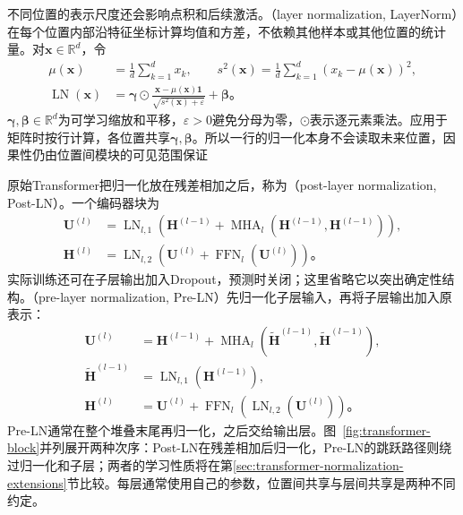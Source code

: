 不同位置的表示尺度还会影响点积和后续激活。（layer normalization, LayerNorm）在每个位置内部沿特征坐标计算均值和方差，不依赖其他样本或其他位置的统计量。对$\bm x\in\mathbb R^d$，令
\begin{equation}
  \begin{aligned}
    \mu(\bm x)&=\frac1d\sum_{k=1}^d x_k,\qquad
    s^2(\bm x)=\frac1d\sum_{k=1}^d(x_k-\mu(\bm x))^2,\\
    \operatorname{LN}(\bm x)
      &=\bm\gamma\odot
        \frac{\bm x-\mu(\bm x)\bm 1}{\sqrt{s^2(\bm x)+\varepsilon}}
        +\bm\beta\text{。}
  \end{aligned}
  \label{eq:transformer-layernorm}
\end{equation}
$\bm\gamma,\bm\beta\in\mathbb R^d$为可学习缩放和平移，$\varepsilon>0$避免分母为零，$\odot$表示逐元素乘法。应用于矩阵时按行计算，各位置共享$\bm\gamma,\bm\beta$。所以一行的归一化本身不会读取未来位置，因果性仍由位置间模块的可见范围保证

原始Transformer把归一化放在残差相加之后，称为（post-layer normalization, Post-LN）。一个编码器块为
\begin{equation}
  \begin{aligned}
    \bm U^{(l)}&=\operatorname{LN}_{l,1}\!\left(
       \bm H^{(l-1)}+\operatorname{MHA}_l(\bm H^{(l-1)},\bm H^{(l-1)})\right),\\
    \bm H^{(l)}&=\operatorname{LN}_{l,2}\!\left(
       \bm U^{(l)}+\operatorname{FFN}_l(\bm U^{(l)})\right)\text{。}
  \end{aligned}
  \label{eq:transformer-postln-block}
\end{equation}
实际训练还可在子层输出加入Dropout，预测时关闭；这里省略它以突出确定性结构。（pre-layer normalization, Pre-LN）先归一化子层输入，再将子层输出加入原表示：
\begin{equation}
  \begin{aligned}
    \bm U^{(l)}&=\bm H^{(l-1)}+
      \operatorname{MHA}_l(\widetilde{\bm H}^{(l-1)},\widetilde{\bm H}^{(l-1)}),\\
    \widetilde{\bm H}^{(l-1)}&=\operatorname{LN}_{l,1}(\bm H^{(l-1)}),\\
    \bm H^{(l)}&=\bm U^{(l)}+
      \operatorname{FFN}_l(\operatorname{LN}_{l,2}(\bm U^{(l)}))\text{。}
  \end{aligned}
  \label{eq:transformer-preln-block}
\end{equation}
Pre-LN通常在整个堆叠末尾再归一化，之后交给输出层。图~\ref{fig:transformer-block}并列展开两种次序：Post-LN在残差相加后归一化，Pre-LN的跳跃路径则绕过归一化和子层；两者的学习性质将在第\ref{sec:transformer-normalization-extensions}节比较。每层通常使用自己的参数，位置间共享与层间共享是两种不同约定。

